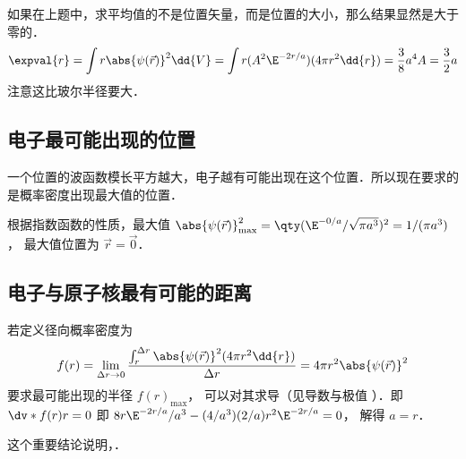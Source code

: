 如果在上题中，求平均值的不是位置矢量，而是位置的大小，那么结果显然是大于零的．
\begin{equation}
\expval{r} = \int r \abs{\psi (\vec r)}^2 \dd{V} = \int r (A^2 \E^{-2r/a})(4\pi r^2 \dd{r})= \frac{3}{8} a^4 A = \frac{3}{2}a
\end{equation}
注意这比玻尔半径要大．

\subsection{电子最可能出现的位置}

 一个位置的波函数模长平方越大，电子越有可能出现在这个位置．所以现在要求的是概率密度出现最大值的位置．
 
根据指数函数的性质，最大值 $\abs{\psi (\vec r)}_{\max}^2 = \qty( \E^{-0/a}/\sqrt{\pi a^3})^2 = 1/(\pi a^3)$， 最大值位置为 $\vec r = \vec 0$．

\subsection{电子与原子核最有可能的距离}
若定义径向概率密度为
\begin{equation}
f(r) = \lim_{\Delta r \to 0} \frac{\int_r^{\Delta r} {\abs{\psi (\vec r)}}^2 (4\pi r^2 \dd{r}) }{\Delta r} = 4\pi r^2 \abs{\psi(\vec r)}^2
\end{equation}
要求最可能出现的半径 $f(r)_{\max}$， 可以对其求导（见导数与极值%
）．即 $\dv*{f(r)}{r} = 0$ 即 $8 r \E^{-2r/a}/a^3 - (4/a^3)(2/a)r^2 \E^{-2r/a} = 0$， 解得 $a = r$． 
 
这个重要结论说明，．

